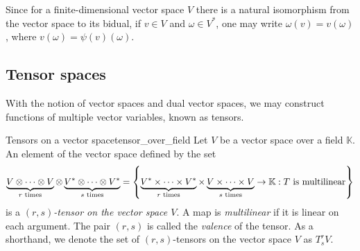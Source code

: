 \begin{remark}
    Since for a finite-dimensional vector space \(V\) there is a natural isomorphism from the vector space to its bidual, if \(v \in V\) and \(\omega \in V ^{\ast}\), one may write \(\omega(v) = v(\omega)\), where \(v(\omega) = \psi(v)(\omega)\).
\end{remark}

\subsection{Tensor spaces}

With the notion of vector spaces and dual vector spaces, we may construct functions of multiple vector variables, known as tensors.

\begin{definition}{Tensors on a vector space}{tensor_over_field}
    Let \(V\) be a vector space over a field \(\mathbb{K}\). An element of the vector space defined by the set
    \begin{equation*}
        \underbrace{V \otimes \dots \otimes V}_{r \text{ times}} \otimes \underbrace{V^\ast \otimes \dots \otimes V^\ast}_{s \text{ times}} = \set*{\underbrace{V^\ast \times \dots \times V^\ast}_{r \text{ times}} \times \underbrace{V \times \dots \times V}_{s \text{ times}} \to \mathbb{K} : T \text{ is multilinear}}
    \end{equation*}
    is a \emph{\((r,s)\)-tensor on the vector space \(V\)}. A map is \emph{multilinear} if it is linear on each argument. The pair \((r,s)\) is called the \emph{valence} of the tensor. As a shorthand, we denote the set of \((r,s)\)-tensors on the vector space \(V\) as \(T_s^rV\).
\end{definition}

